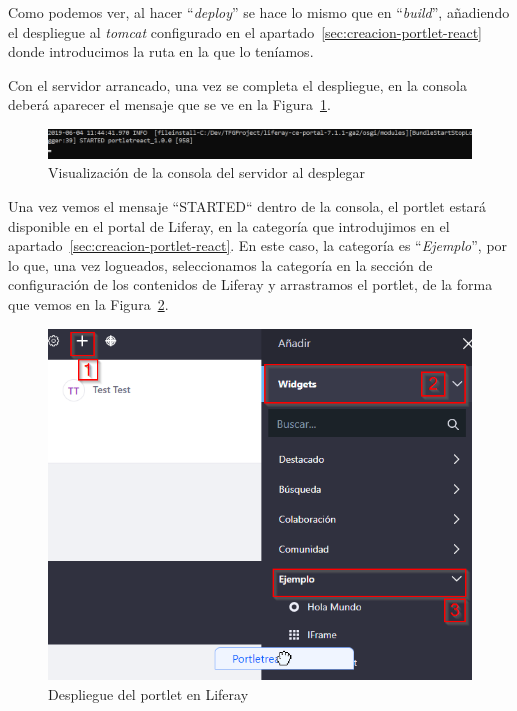 \documentclass[a4paper, 12pt]{book}
\begin{document}
Como podemos ver, al hacer ``\textit{deploy}'' se hace lo mismo que en ``\textit{build}'', añadiendo el despliegue al \textit{tomcat} configurado en el apartado~\ref{sec:creacion-portlet-react} donde introducimos la ruta en la que lo teníamos.

\vspace{5mm}
Con el servidor arrancado, una vez se completa el despliegue, en la consola deberá aparecer el mensaje que se ve en la Figura~\ref{fig:started}.
\begin{figure}[h]
  \centering
  \includegraphics[width=15cm]{img_usadas/started.png}
  \caption{Visualización de la consola del servidor al desplegar}
  \label{fig:started}
\end{figure}

\vspace{5mm}
Una vez vemos el mensaje ``STARTED`` dentro de la consola, el portlet estará disponible en el portal de Liferay, en la categoría que introdujimos en el apartado~\ref{sec:creacion-portlet-react}. En este caso, la categoría es ``\textit{Ejemplo}'', por lo que, una vez logueados, seleccionamos la categoría en la sección de configuración de los contenidos de Liferay y arrastramos el portlet, de la forma que vemos en la Figura~\ref{fig:liferay_ex}.
\begin{figure}[h]
  \centering
  \includegraphics{img_usadas/liferay_ex.png}
  \caption{Despliegue del portlet en Liferay}
  \label{fig:liferay_ex}
\end{figure}
\end{document}
